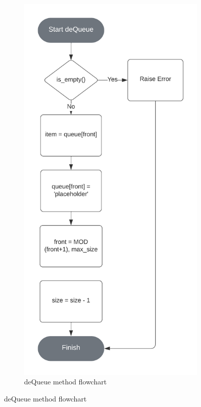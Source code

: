 \documentclass[12pt]{article}
\begin{document}
\begin{figure}[ht]
\begin{subfigure}{.5\textwidth}
      \includegraphics[width=.8\linewidth]{deQueue-circular-queue-flowchart}
        \caption{deQueue method flowchart}
    \end{subfigure}


\end{figure}
\end{document}
